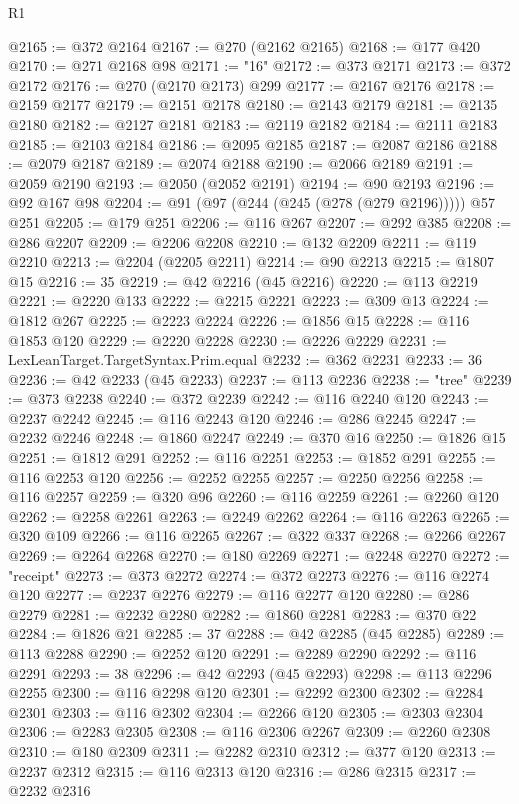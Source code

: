 \begin{lexlean}{R1}
\begin{coremodule}
@2165 := @372 @2164
@2167 := @270 (@2162 @2165)
@2168 := @177 @420
@2170 := @271 @2168 @98
@2171 := "16"
@2172 := @373 @2171
@2173 := @372 @2172
@2176 := @270 (@2170 @2173) @299
@2177 := @2167 @2176
@2178 := @2159 @2177
@2179 := @2151 @2178
@2180 := @2143 @2179
@2181 := @2135 @2180
@2182 := @2127 @2181
@2183 := @2119 @2182
@2184 := @2111 @2183
@2185 := @2103 @2184
@2186 := @2095 @2185
@2187 := @2087 @2186
@2188 := @2079 @2187
@2189 := @2074 @2188
@2190 := @2066 @2189
@2191 := @2059 @2190
@2193 := @2050 (@2052 @2191)
@2194 := @90 @2193
@2196 := @92 @167 @98
@2204 := @91 (@97 (@244 (@245 (@278 (@279 @2196))))) @57 @251
@2205 := @179 @251
@2206 := @116 @267
@2207 := @292 @385
@2208 := @286 @2207
@2209 := @2206 @2208
@2210 := @132 @2209
@2211 := @119 @2210
@2213 := @2204 (@2205 @2211)
@2214 := @90 @2213
@2215 := @1807 @15
@2216 := 35
@2219 := @42 @2216 (@45 @2216)
@2220 := @113 @2219
@2221 := @2220 @133
@2222 := @2215 @2221
@2223 := @309 @13
@2224 := @1812 @267
@2225 := @2223 @2224
@2226 := @1856 @15
@2228 := @116 @1853 @120
@2229 := @2220 @2228
@2230 := @2226 @2229
@2231 := LexLeanTarget.TargetSyntax.Prim.equal
@2232 := @362 @2231
@2233 := 36
@2236 := @42 @2233 (@45 @2233)
@2237 := @113 @2236
@2238 := "tree"
@2239 := @373 @2238
@2240 := @372 @2239
@2242 := @116 @2240 @120
@2243 := @2237 @2242
@2245 := @116 @2243 @120
@2246 := @286 @2245
@2247 := @2232 @2246
@2248 := @1860 @2247
@2249 := @370 @16
@2250 := @1826 @15
@2251 := @1812 @291
@2252 := @116 @2251
@2253 := @1852 @291
@2255 := @116 @2253 @120
@2256 := @2252 @2255
@2257 := @2250 @2256
@2258 := @116 @2257
@2259 := @320 @96
@2260 := @116 @2259
@2261 := @2260 @120
@2262 := @2258 @2261
@2263 := @2249 @2262
@2264 := @116 @2263
@2265 := @320 @109
@2266 := @116 @2265
@2267 := @322 @337
@2268 := @2266 @2267
@2269 := @2264 @2268
@2270 := @180 @2269
@2271 := @2248 @2270
@2272 := "receipt"
@2273 := @373 @2272
@2274 := @372 @2273
@2276 := @116 @2274 @120
@2277 := @2237 @2276
@2279 := @116 @2277 @120
@2280 := @286 @2279
@2281 := @2232 @2280
@2282 := @1860 @2281
@2283 := @370 @22
@2284 := @1826 @21
@2285 := 37
@2288 := @42 @2285 (@45 @2285)
@2289 := @113 @2288
@2290 := @2252 @120
@2291 := @2289 @2290
@2292 := @116 @2291
@2293 := 38
@2296 := @42 @2293 (@45 @2293)
@2298 := @113 @2296 @2255
@2300 := @116 @2298 @120
@2301 := @2292 @2300
@2302 := @2284 @2301
@2303 := @116 @2302
@2304 := @2266 @120
@2305 := @2303 @2304
@2306 := @2283 @2305
@2308 := @116 @2306 @2267
@2309 := @2260 @2308
@2310 := @180 @2309
@2311 := @2282 @2310
@2312 := @377 @120
@2313 := @2237 @2312
@2315 := @116 @2313 @120
@2316 := @286 @2315
@2317 := @2232 @2316

\end{coremodule}
\end{lexlean}
